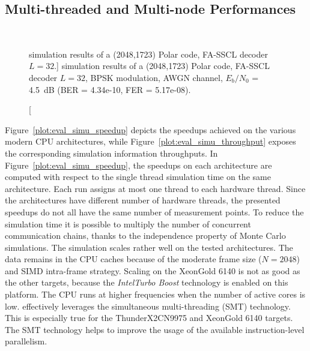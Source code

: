 \subsection{Multi-threaded and Multi-node Performances}
\label{sec:eval_simu_mt}

\begin{figure}[htp]
  \centering
  \\
  \caption
    [\AFFECT simulation results of a (2048,1723) Polar code, FA-SSCL decoder
     $L=32$.]
    {\AFFECT simulation results of a (2048,1723) Polar code, FA-SSCL decoder
     $L=32$, BPSK modulation, AWGN channel, $E_b/N_0$ = 4.5~dB (BER = 4.34e-10,
     FER = 5.17e-08).}
  \label{plot:eval_simu_speedup_throughput}
\end{figure}

Figure~\ref{plot:eval_simu_speedup} depicts the speedups achieved on the various
modern CPU architectures, while Figure~\ref{plot:eval_simu_throughput} exposes
the corresponding simulation information throughputs. In
Figure~\ref{plot:eval_simu_speedup}, the speedups on each architecture are
computed with respect to the single thread simulation time on the same
architecture. Each run assigns at most one \AFFECT thread to each hardware
thread. Since the architectures have different number of hardware threads, the
presented speedups do not all have the same number of measurement points. To
reduce the simulation time it is possible to multiply the number of concurrent
communication chains, thanks to the independence property of Monte
Carlo simulations. The simulation scales rather well on the tested
architectures. The data remains in the CPU caches because of the moderate frame
size ($N = 2048$) and SIMD intra-frame strategy. Scaling on the Xeon\TM Gold
6140 is not as good as the other targets, because the \textit{Intel\R Turbo
Boost} technology is enabled on this platform. The CPU runs at higher
frequencies when the number of active cores is low. \AFFECT effectively
leverages the simultaneous multi-threading (SMT) technology. This is especially
true for the ThunderX2\R CN9975 and Xeon\TM Gold 6140 targets. The SMT
technology helps to improve the usage of the available instruction-level
parallelism.

